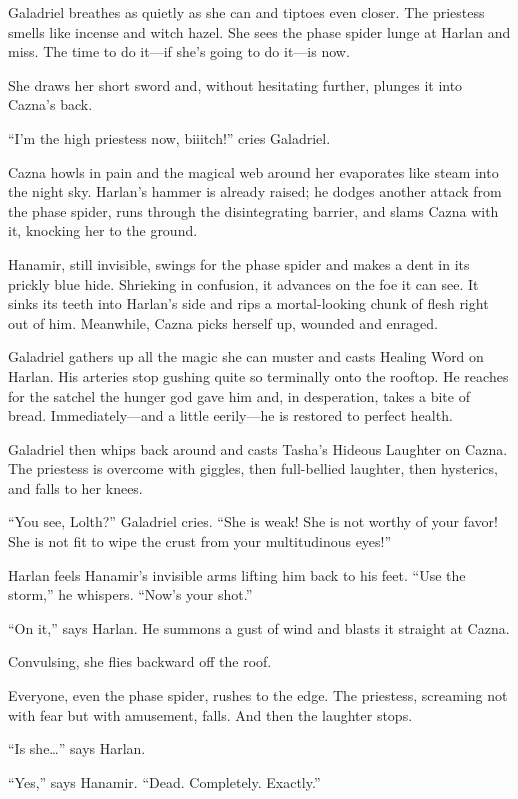 \documentclass[smalldemyvopaper,11pt,twoside,onecolumn,openright,extrafontsizes]{memoir}
\begin{document}
Galadriel breathes as quietly as she can and tiptoes even closer. The
priestess smells like incense and witch hazel. She sees the phase spider
lunge at Harlan and miss. The time to do it---if she's going to do
it---is now.

She draws her short sword and, without hesitating further, plunges it
into Cazna's back.

``I'm the high priestess now, biiitch!'' cries Galadriel.

Cazna howls in pain and the magical web around her evaporates like steam
into the night sky. Harlan's hammer is already raised; he dodges another
attack from the phase spider, runs through the disintegrating barrier,
and slams Cazna with it, knocking her to the ground.

Hanamir, still invisible, swings for the phase spider and makes a dent
in its prickly blue hide. Shrieking in confusion, it advances on the foe
it can see. It sinks its teeth into Harlan's side and rips a
mortal-looking chunk of flesh right out of him. Meanwhile, Cazna picks
herself up, wounded and enraged.

Galadriel gathers up all the magic she can muster and casts Healing Word
on Harlan. His arteries stop gushing quite so terminally onto the
rooftop. He reaches for the satchel the hunger god gave him and, in
desperation, takes a bite of bread. Immediately---and a little
eerily---he is restored to perfect health.

Galadriel then whips back around and casts Tasha's Hideous Laughter on
Cazna. The priestess is overcome with giggles, then full-bellied
laughter, then hysterics, and falls to her knees.

``You see, Lolth?'' Galadriel cries. ``She is weak! She is not worthy of
your favor! She is not fit to wipe the crust from your multitudinous
eyes!''

Harlan feels Hanamir's invisible arms lifting him back to his feet.
``Use the storm,'' he whispers. ``Now's your shot.''

``On it,'' says Harlan. He summons a gust of wind and blasts it straight
at Cazna.

Convulsing, she flies backward off the roof.

Everyone, even the phase spider, rushes to the edge. The priestess,
screaming not with fear but with amusement, falls. And then the laughter
stops.

``Is she\ldots{}'' says Harlan.

``Yes,'' says Hanamir. ``Dead. Completely. Exactly.''
\end{document}
